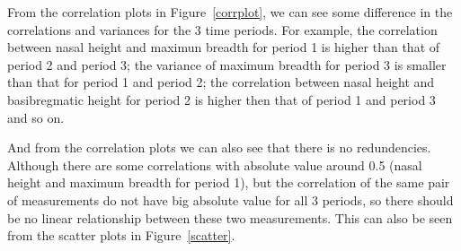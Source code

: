 \documentclass{article}
\begin{document}
\begin{enumerate}[leftmargin = 0 em, label = \arabic*., font = \bfseries]
\begin{enumerate}
		From the correlation plots in Figure~\ref{corrplot}, we can see some difference in the correlations and variances for the 3 time periods. For example, the correlation between nasal height and maximun breadth for period 1 is higher than that of period 2 and period 3; the variance of maximum breadth for period 3 is smaller than that for period 1 and period 2; the correlation between nasal height and  basibregmatic height for period 2 is higher then that of period 1 and period 3 and so on. 

		And from the correlation plots we can also see that there is no redundencies. Although there are some correlations with absolute value around 0.5 (nasal height and maximum breadth for period 1), but the correlation of the same pair of measurements do not have big absolute value for all 3 periods, so there should be no linear relationship between these two measurements. This can also be seen from the scatter plots in Figure~\ref{scatter}.

	\end{enumerate}


\end{enumerate}
\end{document}
